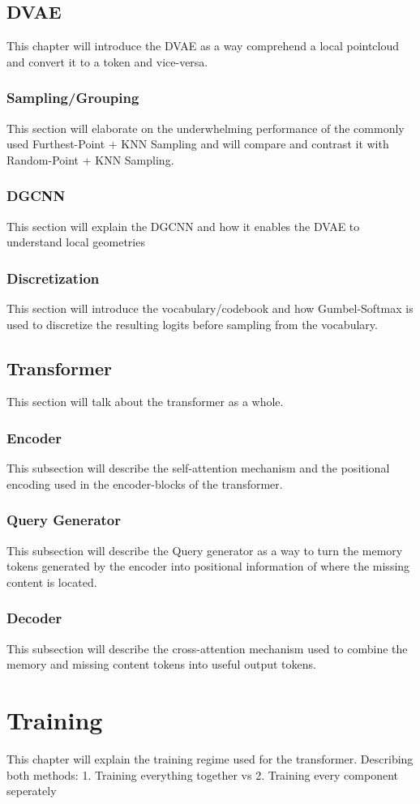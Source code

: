 \section{DVAE}
This chapter will introduce the DVAE \cite{rolfe2017discrete} as a way comprehend a local pointcloud and convert it to a token and vice-versa.
\subsection{Sampling/Grouping}
This section will elaborate on the underwhelming performance of the commonly used Furthest-Point + KNN Sampling and will compare and contrast it with Random-Point + KNN Sampling.
\subsection{DGCNN}
This section will explain the DGCNN \cite{wang2019dynamic} and how it enables the DVAE to understand local geometries
\subsection{Discretization}
This section will introduce the vocabulary/codebook and how Gumbel-Softmax \cite{jang2017categorical} is used to discretize the resulting logits before sampling from the vocabulary.
\section{Transformer}
This section will talk about the transformer as a whole.
\subsection{Encoder}
This subsection will describe the self-attention mechanism and the positional encoding used in the encoder-blocks of the transformer.
\subsection{Query Generator}
This subsection will describe the Query generator as a way to turn the memory tokens generated by the encoder into positional information of where the missing content is located.
\subsection{Decoder}
This subsection will describe the cross-attention mechanism used to combine the memory and missing content tokens into useful output tokens.
\chapter{Training}
This chapter will explain the training regime used for the transformer. Describing both methods: 1. Training everything together vs 2. Training every component seperately 
